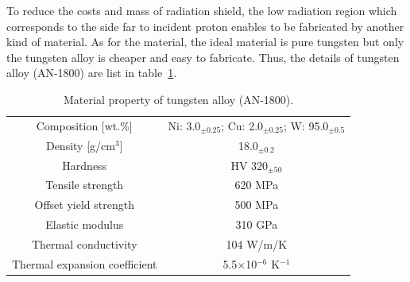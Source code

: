 To reduce the costs and mass of radiation shield, the low radiation region which corresponds to the side far to incident proton enables to be fabricated by another kind of material.
As for the material, the ideal material is pure tungsten but only the tungsten alloy is cheaper and easy to fabricate.
Thus, the details of tungsten alloy (AN-1800) are list in table~\ref{alloy}.
\begin{table}[H]
 \centering
 \begin{tabular}{cc} \hline \hline
  Composition [wt.\%] & Ni: 3.0$_{\pm 0.25}$; Cu: 2.0$_{\pm 0.25}$; W: 95.0$_{\pm 0.5}$ \\
  Density [g/cm$^3$] & 18.0$_{\pm 0.2}$ \\
  Hardness & HV 320$_{\pm 50}$ \\
  Tensile strength & 620 MPa \\
  Offset yield strength & 500 MPa \\
  Elastic modulus & 310 GPa \\
  Thermal conductivity & 104 W/m/K \\
  Thermal expansion coefficient & 5.5$\times$10$^{-6}$ K$^{-1}$ \\ \hline \hline
 \end{tabular}
 \caption{Material property of tungsten alloy (AN-1800).}
 \label{alloy}
\end{table}

